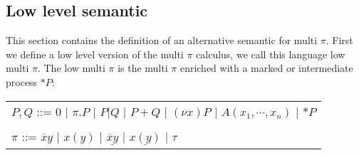 \subsection{Low level semantic}
This section contains the definition of an alternative semantic for multi $\pi$. First we define a low level version of the multi $\pi$ calculus, we call this language low multi $\pi$. The low multi $\pi$ is the multi $\pi$ enriched with a marked or intermediate process $*P$:
\begin{center}
   \begin{tabular}{l}
     $P,Q$ ::= $0$ | $\pi.P$ | $P|Q$ | $P+Q$ | $(\nu x) P$ | $A(x_{1}, \cdots, x_{n})$ | $*P$
   \\\\
     $\pi$ ::= $\overline{x}y$ | $x(y)$ | $\underline{\overline{x}y}$ | $\underline{x(y)}$  | $\tau$ 
   \end{tabular}
\end{center}
